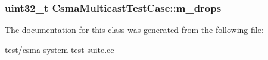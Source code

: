 \subsubsection[{\texorpdfstring{m\+\_\+drops}{m_drops}}]{\setlength{\rightskip}{0pt plus 5cm}uint32\+\_\+t Csma\+Multicast\+Test\+Case\+::m\+\_\+drops\hspace{0.3cm}{\ttfamily [private]}}\hypertarget{classCsmaMulticastTestCase_afbdb28fb92fbae4ac51fdd4c87e886d1}{}\label{classCsmaMulticastTestCase_afbdb28fb92fbae4ac51fdd4c87e886d1}


The documentation for this class was generated from the following file\+:\begin{DoxyCompactItemize}
\item 
test/\hyperlink{csma-system-test-suite_8cc}{csma-\/system-\/test-\/suite.\+cc}\end{DoxyCompactItemize}

